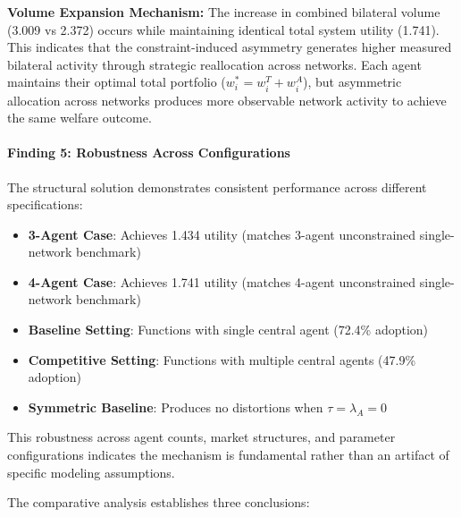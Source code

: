 \textbf{Volume Expansion Mechanism:} The increase in combined bilateral volume (3.009 vs 2.372) occurs while maintaining identical total system utility (1.741). This indicates that the constraint-induced asymmetry generates higher measured bilateral activity through strategic reallocation across networks. Each agent maintains their optimal total portfolio ($w^*_i = w^T_i + w^A_i$), but asymmetric allocation across networks produces more observable network activity to achieve the same welfare outcome.

\paragraph{Finding 5: Robustness Across Configurations}

The structural solution demonstrates consistent performance across different specifications:

\begin{itemize}
    \item \textbf{3-Agent Case}: Achieves 1.434 utility (matches 3-agent unconstrained single-network benchmark)
    \item \textbf{4-Agent Case}: Achieves 1.741 utility (matches 4-agent unconstrained single-network benchmark)
    \item \textbf{Baseline Setting}: Functions with single central agent (72.4\% adoption)
    \item \textbf{Competitive Setting}: Functions with multiple central agents (47.9\% adoption)
    \item \textbf{Symmetric Baseline}: Produces no distortions when $\tau=\lambda_A=0$
\end{itemize}

This robustness across agent counts, market structures, and parameter configurations indicates the mechanism is fundamental rather than an artifact of specific modeling assumptions.


The comparative analysis establishes three conclusions:

